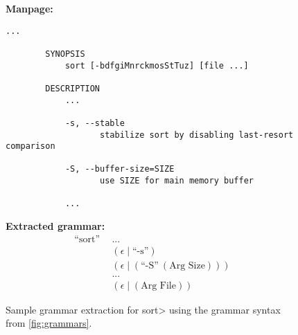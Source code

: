 

\begin{figure}
    \begin{center}
    \begin{minipage}[t]{0.6\linewidth}
        \textbf{Manpage:} \\
        \begin{lstlisting}[gobble=8]
        ...

        SYNOPSIS
            sort [-bdfgiMnrckmosStTuz] [file ...]

        DESCRIPTION
            ...

            -s, --stable
                   stabilize sort by disabling last-resort comparison

            -S, --buffer-size=SIZE
                   use SIZE for main memory buffer

            ...
        \end{lstlisting}
    \end{minipage}
    \begin{minipage}[t]{0.39\linewidth}
        \textbf{Extracted grammar:} \\
        \begin{align*}
            \text{``sort''} ~ ~ & ... \\
                & (\epsilon \mid \text{``-s''}) \\
                & (\epsilon \mid (\text{``-S''} ~ (\text{Arg Size}))) \\
                & ... \\
                & (\epsilon \mid (\text{Arg File}))
        \end{align*}
    \end{minipage}
    \end{center}

    \caption{Sample grammar extraction for \<sort> using the grammar syntax
        from \autoref{fig:grammars}.}
    \label{fig:manpage-extraction}
\end{figure}

